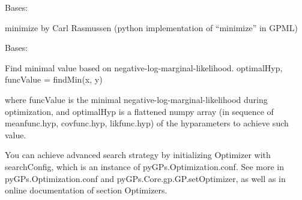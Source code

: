 \documentclass[letterpaper,10pt,english]{sphinxmanual}
\begin{document}

\begin{fulllineitems}
\label{pyGPs.Core:pyGPs.Core.opt.Minimize}
Bases: {\hyperref[pyGPs.Core:pyGPs.Core.opt.Optimizer]{}}

minimize by Carl Rasmussen (python implementation of ``minimize'' in GPML)

\begin{fulllineitems}
\label{pyGPs.Core:pyGPs.Core.opt.Minimize.findMin}
\end{fulllineitems}


\end{fulllineitems}


\begin{fulllineitems}
\label{pyGPs.Core:pyGPs.Core.opt.Optimizer}
Bases: 

\begin{fulllineitems}
\label{pyGPs.Core:pyGPs.Core.opt.Optimizer.findMin}
Find minimal value based on negative-log-marginal-likelihood. 
optimalHyp, funcValue = findMin(x, y)

where funcValue is the minimal negative-log-marginal-likelihood during optimization,
and optimalHyp is a flattened numpy array 
(in sequence of meanfunc.hyp, covfunc.hyp, likfunc.hyp) 
of the hyparameters to achieve such value.

You can achieve advanced search strategy by initializing Optimizer with searchConfig, 
which is an instance of pyGPs.Optimization.conf. 
See more in pyGPs.Optimization.conf and pyGPs.Core.gp.GP.setOptimizer,
as well as in online documentation of section Optimizers.

\end{fulllineitems}


\end{fulllineitems}

\end{document}
